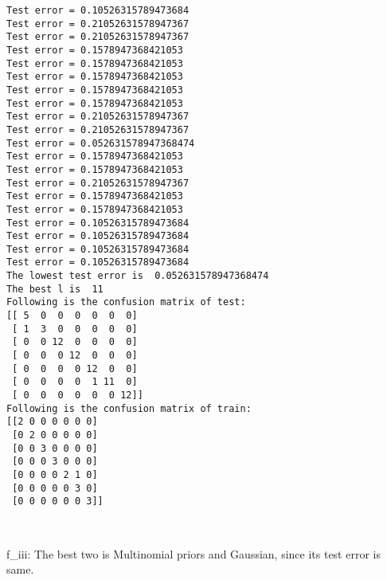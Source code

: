 \documentclass[11pt]{article}
\begin{document}
    \begin{Verbatim}[commandchars=\\\{\}]
Test error = 0.10526315789473684
Test error = 0.21052631578947367
Test error = 0.21052631578947367
Test error = 0.1578947368421053
Test error = 0.1578947368421053
Test error = 0.1578947368421053
Test error = 0.1578947368421053
Test error = 0.1578947368421053
Test error = 0.21052631578947367
Test error = 0.21052631578947367
Test error = 0.052631578947368474
Test error = 0.1578947368421053
Test error = 0.1578947368421053
Test error = 0.21052631578947367
Test error = 0.1578947368421053
Test error = 0.1578947368421053
Test error = 0.10526315789473684
Test error = 0.10526315789473684
Test error = 0.10526315789473684
Test error = 0.10526315789473684
The lowest test error is  0.052631578947368474
The best l is  11
Following is the confusion matrix of test: 
[[ 5  0  0  0  0  0  0]
 [ 1  3  0  0  0  0  0]
 [ 0  0 12  0  0  0  0]
 [ 0  0  0 12  0  0  0]
 [ 0  0  0  0 12  0  0]
 [ 0  0  0  0  1 11  0]
 [ 0  0  0  0  0  0 12]]
Following is the confusion matrix of train: 
[[2 0 0 0 0 0 0]
 [0 2 0 0 0 0 0]
 [0 0 3 0 0 0 0]
 [0 0 0 3 0 0 0]
 [0 0 0 0 2 1 0]
 [0 0 0 0 0 3 0]
 [0 0 0 0 0 0 3]]

    \end{Verbatim}

    \begin{center}
    \end{center}
    { \hspace*{\fill} \\}
    
    f\_iii: The best two is Multinomial priors and Gaussian, since its test
error is same.


    
    
    
    
\end{document}
